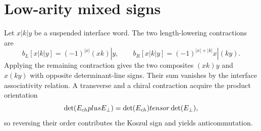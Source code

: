 \chapter{Low-arity mixed signs}
Let $x|k|y$ be a suspended interface word.  The two length-lowering contractions are
\[
 b_L[x|k|y]=(-1)^{|x|}(xk)|y,
 \qquad
 b_R[x|k|y]=(-1)^{|x|+|k|}x|(ky).
\]
Applying the remaining contraction gives the two composites $(xk)y$ and $x(ky)$ with opposite determinant-line signs.  Their sum vanishes by the interface associativity relation.  A transverse and a chiral contraction acquire the product orientation
\[
 \det(E_{ch}plus E_\perp)
 =\det(E_{ch})tensor\det(E_\perp),
\]
so reversing their order contributes the Koszul sign and yields anticommutation.
